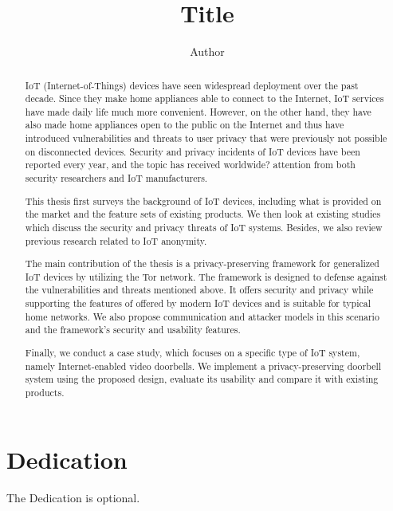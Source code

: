 \documentclass[12pt]{report}
\title{Title}
\author{Author}
\begin{document}

\maketitle    %

\begin{abstract}

IoT (Internet-of-Things) devices have seen widespread deployment over the past decade. Since they make home appliances able to connect to the Internet, IoT services have made daily life much more convenient. However, on the other hand, they have also made home appliances open to the public on the Internet and thus have introduced vulnerabilities and threats to user privacy that were previously not possible on disconnected devices. Security and privacy incidents of IoT devices have been reported every year, and the topic has received worldwide? attention from both security researchers and IoT manufacturers.

This thesis first surveys the background of IoT devices, including what is provided on the market and the feature sets of existing products. We then look at existing studies which discuss the security and privacy threats of IoT systems. Besides, we also review previous research related to IoT anonymity.

The main contribution of the thesis is a privacy-preserving framework for generalized IoT devices by utilizing the Tor network. The framework is designed to defense against the vulnerabilities and threats mentioned above. It offers security and privacy while supporting the features of offered by modern IoT devices and is suitable for typical home networks. We also propose communication and attacker models in this scenario and the framework's security and usability features.

Finally, we conduct a case study, which focuses on a specific type of IoT system, namely Internet-enabled video doorbells. We implement a privacy-preserving doorbell system using the proposed design, evaluate its usability and compare it with existing products.

\end{abstract}


\chapter*{Dedication}

The Dedication is optional.
\end{document}

